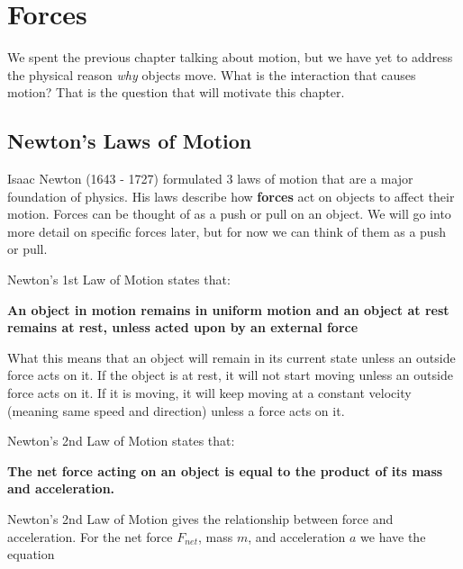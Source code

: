 \documentclass[12pt]{book}
\begin{document}
\chapter{Forces}
\setcounter{example}{1}
\addtocounter{chp}{1}

We spent the previous chapter talking about motion, but we have yet to address the physical reason \textit{why} objects move. What is the interaction that causes motion? That is the question that will motivate this chapter.

\section{Newton's Laws of Motion}

Isaac Newton (1643 - 1727) formulated 3 laws of motion that are a major foundation of physics. His laws describe how \textbf{forces} act on objects to affect their motion. Forces can be thought of as a push or pull on an object. We will go into more detail on specific forces later, but for now we can think of them as a push or pull.

\linespace

Newton's 1st Law of Motion states that:

\hspace{10pt}

\textbf{An object in motion remains in uniform motion and an object at rest remains at rest, unless acted upon by an external force}

\linespace

What this means that an object will remain in its current state unless an outside force acts on it. If the object is at rest, it will not start moving unless an outside force acts on it. If it is moving, it will keep moving at a constant velocity (meaning same speed and direction) unless a force acts on it.

\linespace

Newton's 2nd Law of Motion states that:



\hspace{10pt}

\textbf{The net force acting on an object is equal to the product of its mass and acceleration.}



\linespace

Newton's 2nd Law of Motion gives the relationship between force and acceleration. For the net force $F_{net}$, mass $m$, and acceleration $a$ we have the equation
\end{document}
